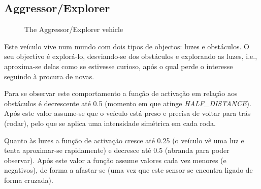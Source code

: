 \documentclass[a4paper]{article}
\begin{document}
\subsection{Aggressor/Explorer}
\begin{figure}[h]
	\centering
	
	\caption{The Aggressor/Explorer vehicle}
\end{figure}

Este veículo vive num mundo com dois tipos de objectos: luzes e obstáculos.
O seu objectivo é explorá-lo, desviando-se dos obstáculos e explorando as luzes, i.e.,
aproxima-se delas como se estivesse curioso, após o qual perde o interesse seguindo à procura de novas.

Para se observar este comportamento a função de activação em relação aos obstáculos é decrescente até 0.5 (momento em que atinge \emph{HALF\_DISTANCE}).
Após este valor assume-se que o veículo está preso e precisa de voltar para trás (rodar), pelo que se aplica uma intensidade simétrica em cada roda.

Quanto às luzes a função de activação cresce até 0.25 (o veículo vê uma luz e tenta aproximar-se rapidamente) e decresce até 0.5 (abranda para poder observar).
Após este valor a função assume valores cada vez menores (e negativos), de forma a afastar-se (uma vez que este sensor se encontra ligado de forma cruzada).

\cleardoublepage
\end{document}
